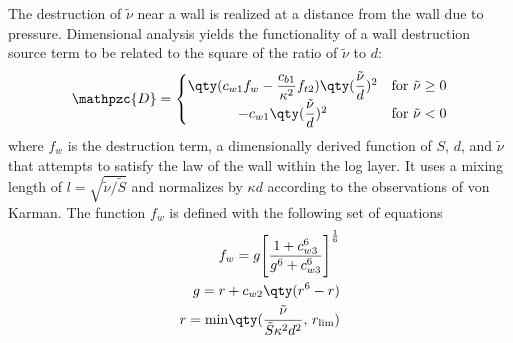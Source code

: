 The destruction of $\tilde{\nu}$ near a wall is realized at a distance from the wall due to pressure. Dimensional analysis yields the functionality of a wall destruction source term to be related to the square of the ratio of $\tilde{\nu}$ to $d$:
%
\begin{align}
\mathpzc{D} = \begin{cases}
  \qty(c_{w1}f_w-\dfrac{c_{b1}}{\kappa^2}f_{t2})\qty(\dfrac{\tilde\nu}{d})^2 & $for $ \tilde\nu \geq 0 \\
  \hfil -c_{w1}\qty(\dfrac{\tilde\nu}{d})^2      & $for $ \tilde\nu < 0
\end{cases}
\end{align}
%
where $f_w$ is the destruction term, a dimensionally derived function of $S$, $d$, and $\tilde{\nu}$ that attempts to satisfy the law of the wall within the log layer. It uses a mixing length of $l = \sqrt{\tilde{\nu}/\tilde{S}}$ and normalizes by $\kappa d$ according to the observations of von Karman. The function $f_w$ is defined with the following set of equations
%
%
\begin{align} \begin{split}
  f_w = g\Bigg[\dfrac{1+c^6_{w3}}{g^6 + c^6_{w3}}\Bigg]^{\frac{1}{6}} \\
  g = r + c_{w2}\qty(r^6 - r) \\
  r = \text{min}\qty(\dfrac{\tilde{\nu}}{\tilde{S}\kappa^2d^2},\,r_{\text{lim}})
\end{split} \label{eq:SA_fwterms} \end{align}




